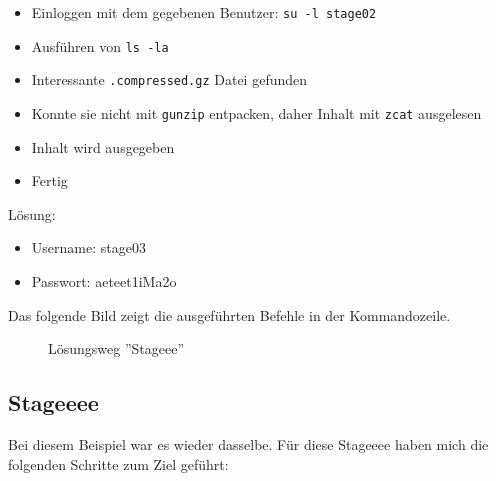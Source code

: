 \documentclass[12pt, a4paper, titlepage, oneside]{scrartcl}
\begin{document}
	\begin{itemize}
		\item Einloggen mit dem gegebenen Benutzer: \lstinline{su -l stage02}

		\item Ausführen von \lstinline{ls -la}

		\item Interessante \lstinline{.compressed.gz} Datei gefunden

		\item Konnte sie nicht mit \lstinline{gunzip} entpacken, daher Inhalt mit \lstinline{zcat}
			ausgelesen

		\item Inhalt wird ausgegeben

		\item Fertig
	\end{itemize}

	Lösung:
	\begin{itemize}
		\item Username: stage03

		\item Passwort: aeteet1iMa2o
	\end{itemize}

	Das folgende Bild zeigt die ausgeführten Befehle in der Kommandozeile.
	\begin{figure}[h!]
		\centering
		\caption{Lösungsweg ''Stageee''}
		\label{fig:stageee_solution}
	\end{figure}

	\newpage

	\subsection{Stageeee}
	Bei diesem Beispiel war es wieder dasselbe. Für diese Stageeee haben mich die
	folgenden Schritte zum Ziel geführt:
\end{document}
